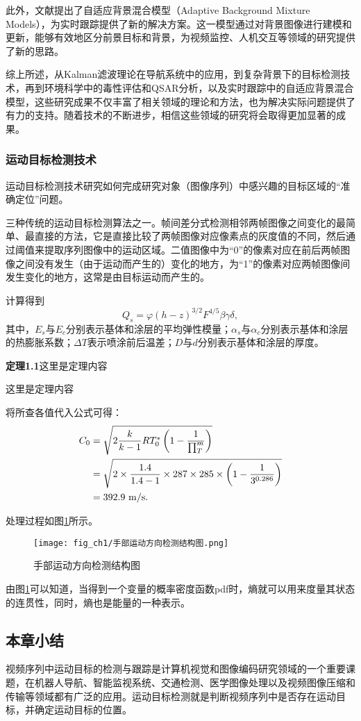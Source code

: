 此外，文献\cite{Stauffer1999}提出了自适应背景混合模型（Adaptive Background Mixture Models），为实时跟踪提供了新的解决方案。这一模型通过对背景图像进行建模和更新，能够有效地区分前景目标和背景，为视频监控、人机交互等领域的研究提供了新的思路。

综上所述，从Kalman滤波理论在导航系统中的应用，到复杂背景下的目标检测技术，再到环境科学中的毒性评估和QSAR分析，以及实时跟踪中的自适应背景混合模型，这些研究成果不仅丰富了相关领域的理论和方法，也为解决实际问题提供了有力的支持。随着技术的不断进步，相信这些领域的研究将会取得更加显著的成果。

\subsubsection{运动目标检测技术}

运动目标检测技术研究如何完成研究对象（图像序列）中感兴趣的目标区域的“准确定位”问题。


三种传统的运动目标检测算法之一。帧间差分式检测相邻两帧图像之间变化的最简单、最直接的方法，它是直接比较了两帧图像对应像素点的灰度值的不同，然后通过阈值来提取序列图像中的运动区域。二值图像中为“$0$”的像素对应在前后两帧图像之间没有发生（由于运动而产生的）变化的地方，为“1”的像素对应两帧图像间发生变化的地方，这常是由目标运动而产生的。

计算得到
\begin{equation}%
Q_s = \varphi(h-z)^{3/2}F^{4/5}\beta\gamma\delta,
\end{equation}
其中，$E_s$与$E_c$分别表示基体和涂层的平均弹性模量；$\alpha_s$与$\alpha_c$分别表示基体和涂层的热膨胀系数；$\Delta T$表示喷涂前后温差；$D$与$d$分别表示基体和涂层的厚度。

{\bf 定理1.1}\quad 这里是定理内容 %
\begin{Theorem}
这里是定理内容
\end{Theorem}

将所查各值代入公式可得：
\begin{align}%
  C_0 &= \sqrt{ 2\frac{k}{k-1}RT_0^{\ast}\lt(1-\frac{1}{\prod_{T}^{m}}\rt) } \notag \\
   &= \sqrt{ 2\times \frac{1.4}{1.4-1}\times 287\times 285\times \lt( 1-\frac{1}{3^{0.286}} \rt) } \notag \\
   &= 392.9~\unit{m/s}.
\end{align}

处理过程如图\ref{fig:手部运动方向检测结构图}所示。
\begin{figure}[H]
  \centering
  \texttt{[image: fig\_ch1/手部运动方向检测结构图.png]}
  \caption{手部运动方向检测结构图}
  \label{fig:手部运动方向检测结构图}
\end{figure}

由图\ref{fig:手部运动方向检测结构图}可以知道，当得到一个变量的概率密度函数pdf时，熵就可以用来度量其状态的连贯性，同时，熵也是能量的一种表示。

\subsection{本章小结}

视频序列中运动目标的检测与跟踪是计算机视觉和图像编码研究领域的一个重要课题，在机器人导航、智能监视系统、交通检测、医学图像处理以及视频图像压缩和传输等领域都有广泛的应用。运动目标检测就是判断视频序列中是否存在运动目标，并确定运动目标的位置。